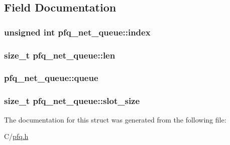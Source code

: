 \subsection{Field Documentation}
\hypertarget{structpfq__net__queue_af66bc8d91f38d0d6c218c9bae8081185}{
\subsubsection[{index}]{\setlength{\rightskip}{0pt plus 5cm}unsigned int pfq\+\_\+net\+\_\+queue\+::index}}\label{structpfq__net__queue_af66bc8d91f38d0d6c218c9bae8081185}
\hypertarget{structpfq__net__queue_a4b511d3c1dbd8d9ed36008500bd44350}{
\subsubsection[{len}]{\setlength{\rightskip}{0pt plus 5cm}size\+\_\+t pfq\+\_\+net\+\_\+queue\+::len}}\label{structpfq__net__queue_a4b511d3c1dbd8d9ed36008500bd44350}
\hypertarget{structpfq__net__queue_a4858e72d7edbe741638986afc0ba9282}{
\subsubsection[{queue}]{ pfq\+\_\+net\+\_\+queue\+::queue}}\label{structpfq__net__queue_a4858e72d7edbe741638986afc0ba9282}
\hypertarget{structpfq__net__queue_ad15e389ac5a91523cccb571c094d3f4e}{
\subsubsection[{slot\+\_\+size}]{\setlength{\rightskip}{0pt plus 5cm}size\+\_\+t pfq\+\_\+net\+\_\+queue\+::slot\+\_\+size}}\label{structpfq__net__queue_ad15e389ac5a91523cccb571c094d3f4e}


The documentation for this struct was generated from the following file\+:\begin{DoxyCompactItemize}
\item 
C/\hyperlink{pfq_8h}{pfq.\+h}\end{DoxyCompactItemize}
